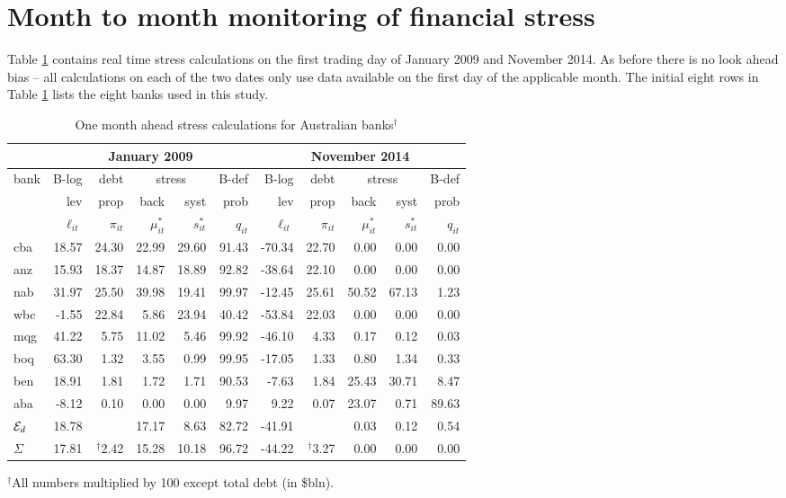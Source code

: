 \documentclass[authoryear]{elsarticle}
\newcommand{\Ex}{{\cal E}}
\newcommand{\tref}[1]{Table \ref{#1}}
\begin{document}
\section*{Month to month monitoring  of financial stress}
 \tref{twodates} contains real time stress calculations on the first trading day of  January 2009 and November 2014.  As before there is no look ahead bias -- all calculations on each of the two dates only use data available on the first day of the applicable month.   The initial eight rows in \tref{twodates} lists the eight banks used in this study. 
 
 \begin{table}[ht]
\caption{One month ahead stress calculations for Australian banks$^\dag$}\label{twodates}
\centering
\small
\vspace{4mm}
\begin{tabular}{l|rrrrr|rrrrr}
\hline
&\multicolumn{5}{c|}{January 2009}&\multicolumn{5}{c}{November 2014}\\
  \hline
bank & B-log& debt &\multicolumn{2}{c}{stress}&  B-def   & B-log& debt   & \multicolumn{2}{c}{stress}& B-def \\
  \cline{4-5}\cline{9-10}
       &  lev& prop    & back & syst & prob & lev& prop  & back & syst & prob \\
  \cline{2-11} 
         & $\ell_{it} $ & $\pi_{it}$ & $\mu^*_{it}$  & $s^*_{it}$ & $q_{it}$  
         & $\ell_{it} $ & $\pi_{it}$ & $\mu^*_{it}$  & $s^*_{it}$ & $q_{it}$  
        \\
  \hline
cba & 18.57 & 24.30 & 22.99 & 29.60 & 91.43 & -70.34 & 22.70 & 0.00 & 0.00 & 0.00 \\ 
  anz & 15.93 & 18.37 & 14.87 & 18.89 & 92.82 & -38.64 & 22.10 & 0.00 & 0.00 & 0.00 \\ 
  nab & 31.97 & 25.50 & 39.98 & 19.41 & 99.97 & -12.45 & 25.61 & 50.52 & 67.13 & 1.23 \\ 
  wbc & -1.55 & 22.84 & 5.86 & 23.94 & 40.42 & -53.84 & 22.03 & 0.00 & 0.00 & 0.00 \\ 
  mqg & 41.22 & 5.75 & 11.02 & 5.46 & 99.92 & -46.10 & 4.33 & 0.17 & 0.12 & 0.03 \\ 
  boq & 63.30 & 1.32 & 3.55 & 0.99 & 99.95 & -17.05 & 1.33 & 0.80 & 1.34 & 0.33 \\ 
  ben & 18.91 & 1.81 & 1.72 & 1.71 & 90.53 & -7.63 & 1.84 & 25.43 & 30.71 & 8.47 \\ 
  aba & -8.12 & 0.10 & 0.00 & 0.00 & 9.97 & 9.22 & 0.07 & 23.07 & 0.71 & 89.63 \\ 
  \hline
  $\Ex_d$ & 18.78 &  & 17.17 & 8.63 & 82.72 & -41.91 &  & 0.03 & 0.12 & 0.54 \\ 
  $\Sigma$ & 17.81 & $^\dag$2.42 & 15.28 & 10.18 & 96.72 & -44.22 & $^\dag$3.27 & 0.00 & 0.00 & 0.00 \\ 
\hline
\end{tabular}
$^\dag$All numbers multiplied by 100 except total debt (in \$bln).
\end{table}
\normalsize
\end{document}
